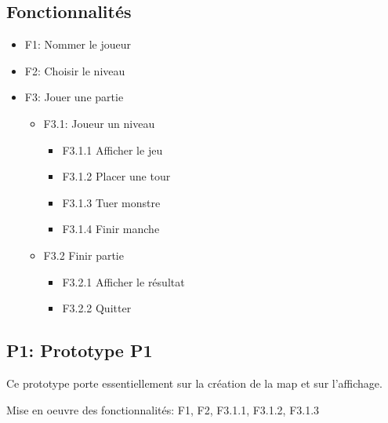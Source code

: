 \documentclass[a4paper]{article}
\begin{document}
        \subsection{Fonctionnalités}
        \begin{itemize}
        \item F1: Nommer le joueur
        \item F2: Choisir le niveau
        \item F3: Jouer une partie
        
    
        \begin{itemize}
          \item F3.1: Joueur un niveau
          \begin{itemize}
          \item F3.1.1 Afficher le jeu
          \item F3.1.2 Placer une tour
          \item F3.1.3 Tuer monstre
          \item F3.1.4 Finir manche
          \newline
        \end{itemize}
        
          \item F3.2 Finir partie
            \begin{itemize}
        \item F3.2.1 Afficher le résultat
        \item F3.2.2 Quitter
            \end{itemize}
            \end{itemize}
            \end{itemize}
        \subsection{P1: Prototype P1}
        Ce prototype porte essentiellement sur la création de la map et sur l'affichage.
        
        Mise en oeuvre des fonctionnalités: F1, F2, F3.1.1, F3.1.2, F3.1.3
        
\end{document}
